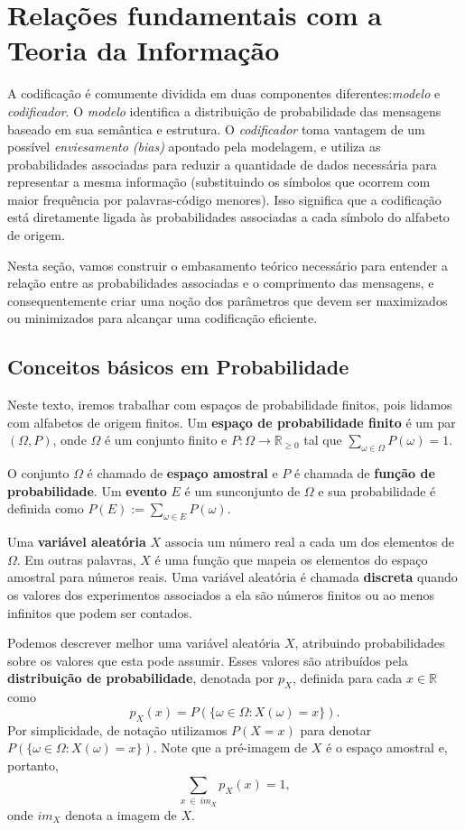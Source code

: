 \section{Relações fundamentais com a Teoria da Informação}
A codificação é comumente dividida em duas componentes diferentes:\emph{modelo} e \emph{codificador}. 
O \emph{modelo} identifica a distribuição de probabilidade das mensagens baseado em sua semântica e estrutura. 
O \emph{codificador} toma vantagem de um possível \emph{enviesamento (bias)} apontado pela modelagem, e utiliza as probabilidades associadas para reduzir a quantidade de dados necessária para representar a mesma informação (substituindo os símbolos que ocorrem com maior frequência por palavras-código menores).
Isso significa que a codificação está diretamente ligada às probabilidades associadas a cada símbolo do alfabeto de origem.

Nesta seção, vamos construir o embasamento teórico necessário para entender a relação entre as probabilidades associadas e o comprimento das mensagens, e consequentemente criar uma noção dos parâmetros que devem ser maximizados ou minimizados para alcançar uma codificação eficiente.

\subsection{Conceitos básicos em Probabilidade}
Neste texto, iremos trabalhar com espaços de probabilidade finitos,
pois lidamos com alfabetos de origem finitos. Um \textbf{espaço de
  probabilidade finito} é um par $(\Omega, P)$, onde $\Omega$ é um
conjunto finito e $P\colon \Omega \to \mathbb{R}_{\geq 0}$ tal que
$\sum_{\omega \in \Omega} P(\omega) = 1$.

O conjunto $\Omega$ é chamado de \textbf{espaço amostral} e $P$ é
chamada de \textbf{função de probabilidade}. Um \textbf{evento} $E$ é
um sunconjunto de $\Omega$ e sua probabilidade é definida como $P(E)
:= \sum_{\omega \in E} P(\omega)$.

Uma \textbf{variável aleatória} $X$ associa um número real a cada
um dos elementos de $\Omega$. Em outras palavras, $X$ é uma
função que mapeia os elementos do espaço amostral para números
reais. Uma variável aleatória é chamada \textbf{discreta} quando os
valores dos experimentos associados a ela são números finitos ou ao
menos infinitos que podem ser contados.

Podemos descrever melhor uma variável aleatória $X$, atribuindo
probabilidades sobre os valores que esta pode assumir. Esses valores
são atribuídos pela \textbf{distribuição de probabilidade}, denotada
por $p_X$, definida para cada $x\in\mathbb{R}$ como
\begin{equation} \label{eq:dist_prob_def}
p_X(x) = P(\{\omega\in \Omega: X(\omega) = x\}).
\end{equation}
Por simplicidade, de notação utilizamos $P(X=x)$ para denotar
$P(\{\omega\in \Omega: X(\omega) = x\})$. Note que a pré-imagem de $X$
é o espaço amostral e, portanto,
\begin{equation} \label{eq:dist_prob_sum}
\sum_{x ~\in ~im_X}^{}p_X(x) = 1,
\end{equation}
onde $im_X$ denota a imagem de $X$.

